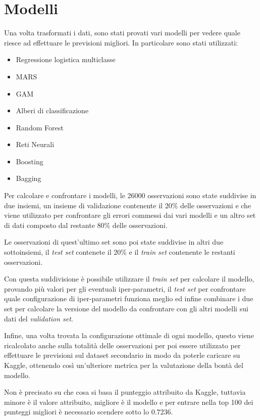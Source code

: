 
\section{Modelli}

Una volta trasformati i dati, sono stati provati vari modelli per vedere quale riesce ad effettuare le previsioni migliori.
In particolare sono stati utilizzati:

\begin{itemize}
	\item Regressione logistica multiclasse
	\item MARS
	\item GAM
	\item Alberi di classificazione
	\item Random Forest
	\item Reti Neurali
	\item Boosting
	\item Bagging
\end{itemize}

Per calcolare e confrontare i modelli, le 26000 osservazioni sono state suddivise in due insiemi, un insieme di validazione contenente il 20\% delle osservazioni e che viene utilizzato per confrontare gli errori commessi dai vari modelli e un altro set di dati composto dal restante 80\% delle osservazioni.

Le osservazioni di quest'ultimo set sono poi state suddivise in altri due sottoinsiemi, il \textit{test set} contenete il 20\% e il \textit{train set} contenente le restanti osservazioni. 

Con questa suddivisione è possibile utilizzare il \textit{train set} per calcolare il modello, provando più valori per gli eventuali iper-parametri, il \textit{test set} per confrontare quale configurazione di iper-parametri funziona meglio ed infine combinare i due set per calcolare la versione del modello da confrontare con gli altri modelli sui dati del \textit{validation set}.

Infine, una volta trovata la configurazione ottimale di ogni modello, questo viene ricalcolato anche sulla totalità delle osservazioni per poi essere utilizzato per effettuare le previsioni sul dataset secondario in modo da poterle caricare su Kaggle, ottenendo così un'ulteriore metrica per la valutazione della bontà del modello. 

Non è precisato su che cosa si basa il punteggio attribuito da Kaggle, tuttavia minore è il valore attribuito, migliore è il modello e per entrare nella top 100 dei punteggi migliori è necessario scendere sotto lo $0.7236$.

